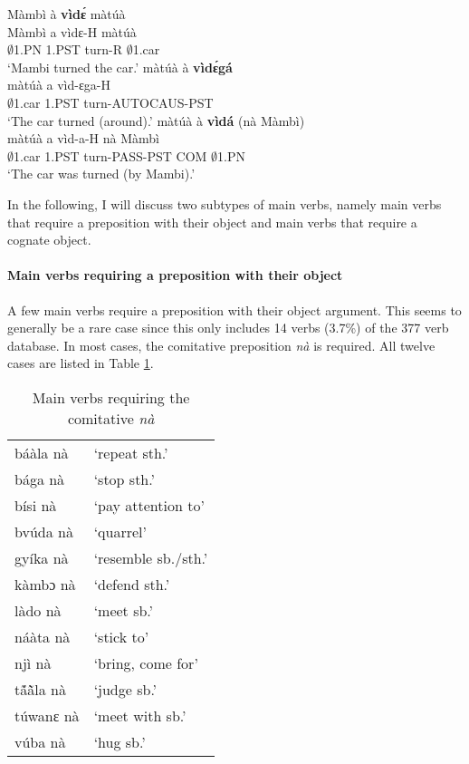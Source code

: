 \begin{exe}
\ex\label{Vale}
\begin{xlist}
\ex \label{Valea}
   \glll  Màmbì à {\bfseries vìdɛ́} màtúà  \\
          Màmbì a vìdɛ-H màtúà \\
          $\emptyset$1.PN 1.PST turn-R $\emptyset$1.car   \\
    \trans `Mambi turned the car.'
\ex\label{Valeb}
\glll  màtúà à {\bfseries vìdɛ́gá} \\
      màtúà a vìd-ɛga-H  \\
       $\emptyset$1.car 1.PST turn-AUTOCAUS-PST     \\
    \trans `The car turned (around).'
\ex\label{Valec}
\glll  màtúà à {\bfseries vìdá} (nà Màmbì) \\
      màtúà a vìd-a-H nà Màmbì \\
        $\emptyset$1.car 1.PST turn-PASS-PST COM $\emptyset$1.PN    \\
    \trans `The car was turned (by Mambi).'
 \end{xlist}
\end{exe}

\noindent In the following, I will discuss two subtypes of main verbs, namely main verbs that require a preposition with their object and main verbs that require a cognate object.

\paragraph{Main verbs requiring a preposition with their object}

A few main verbs require a preposition with their object argument. This seems to generally be a rare case since this only includes 14 verbs (3.7\%) of the 377 verb database. In most cases, the comitative preposition {\itshape nà} is required. All twelve cases are listed in Table \ref{Tab:Verbsna}.

\begin{table} 
\centering
\begin{tabular}{ll}
 \midrule
báàla nà &	 `repeat sth.' \\
bága nà & 	`stop sth.' \\
bísi nà & 	`pay attention to' \\
bvúda nà & 	`quarrel' \\
gyíka nà & 	`resemble sb./sth.' \\
kàmbɔ nà	 & `defend sth.' \\
làdo nà & 	`meet sb.' \\
náàta nà	&  `stick to' \\
njì nà & 	`bring, come for' \\
tã́ã̀la nà & 	`judge sb.' \\
túwanɛ nà	 & `meet with sb.' \\
vúba nà & 	`hug sb.' \\
 \midrule
\end{tabular}
\caption{Main verbs requiring the comitative {\itshape nà}}
\label{Tab:Verbsna}
\end{table}

